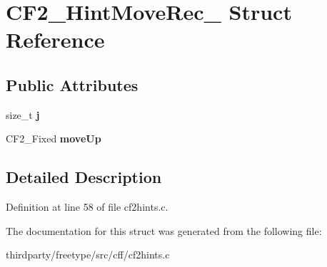 \hypertarget{struct_c_f2___hint_move_rec__}{}\section{C\+F2\+\_\+\+Hint\+Move\+Rec\+\_\+ Struct Reference}
\label{struct_c_f2___hint_move_rec__}
\subsection*{Public Attributes}
\begin{DoxyCompactItemize}
\item 
\mbox{\label{struct_c_f2___hint_move_rec___a56e2c6dfe248ac0d46a9f7319eec2ed7}} 
size\+\_\+t {\bfseries j}
\item 
\mbox{\label{struct_c_f2___hint_move_rec___aa2f60f799c3176a0b578bfba33ab3a75}} 
C\+F2\+\_\+\+Fixed {\bfseries move\+Up}
\end{DoxyCompactItemize}


\subsection{Detailed Description}


Definition at line 58 of file cf2hints.\+c.



The documentation for this struct was generated from the following file\+:\begin{DoxyCompactItemize}
\item 
thirdparty/freetype/src/cff/cf2hints.\+c\end{DoxyCompactItemize}
